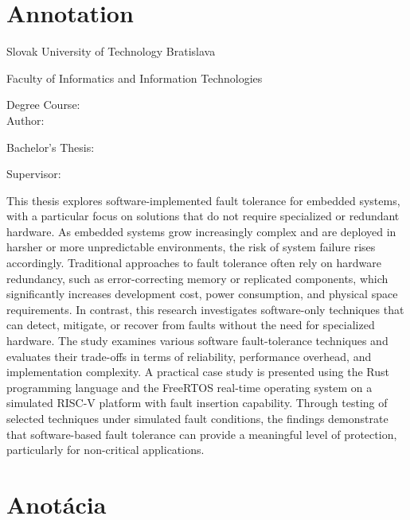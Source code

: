 
\thispagestyle{empty}

\section*{Annotation}

\begin{minipage}[t]{1\columnwidth}%
Slovak University of Technology Bratislava 

Faculty of Informatics and Information Technologies

Degree Course: \myStudyProgram\\

Author: \myName

Bachelor's Thesis: \myTitle

Supervisor: \mySupervisor

\myDate%
\end{minipage}

\bigskip{}

This thesis explores software-implemented fault tolerance for embedded systems, with a particular focus on solutions that do not require specialized or redundant hardware. As embedded systems grow increasingly complex and are deployed in harsher or more unpredictable environments, the risk of system failure rises accordingly. Traditional approaches to fault tolerance often rely on hardware redundancy, such as error-correcting memory or replicated components, which significantly increases development cost, power consumption, and physical space requirements. In contrast, this research investigates software-only techniques that can detect, mitigate, or recover from faults without the need for specialized hardware. The study examines various software fault-tolerance techniques and evaluates their trade-offs in terms of reliability, performance overhead, and implementation complexity. A practical case study is presented using the Rust programming language and the FreeRTOS real-time operating system on a simulated RISC-V platform with fault insertion capability. Through testing of selected techniques under simulated fault conditions, the findings demonstrate that software-based fault tolerance can provide a meaningful level of protection, particularly for non-critical applications.

\thispagestyle{empty}
\mbox{}
\newpage

\thispagestyle{empty}
\section*{Anotácia}

